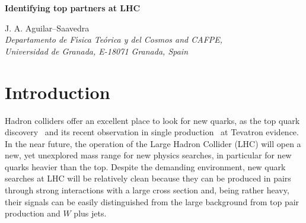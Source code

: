 \documentclass[12pt,a4paper]{article}
\newcommand{\fbin}{fb$^{-1}$}
\newcommand{\TB}{(T \, B)}
\newcommand{\XT}{(X \, T)}
\newcommand{\BY}{(B \, Y)}
\begin{document}
\begin{center}
\begin{Large}
{\bf Identifying top partners at LHC}
\end{Large}


\vspace{0.5cm}
J. A. Aguilar--Saavedra  \\[0.2cm] 
{\it Departamento de F\'{\i}sica Te\'orica y del Cosmos and CAFPE, \\
Universidad de Granada, E-18071 Granada, Spain} \\[0.1cm]
\end{center}

\begin{abstract}
We systematically study the possible signals at LHC of new vector-like quarks mainly coupled to the third generation. We consider heavy quarks $T$, $B$, $X$, $Y$ of charges $2/3$, $-1/3$, $5/3$ and $-4/3$, respectively, in $\text{SU}(2)_L$ isosinglets $T_{L,R}$, $B_{L,R}$, or isodoublets $\TB_{L,R}$, $\XT_{L,R}$ or $\BY_{L,R}$. Analyses based on a fast detector simulation are presented for twelve different final states containing one, two, three or four charged leptons in several invariant mass regions, also considering various $b$ quark multiplicities. It is shown that with the combination of the different channels the new quarks can be identified and their charged and neutral decays established. The comparison among final states also shows that the single lepton one offers the best discovery potential at LHC. For heavy quark masses of 500 GeV, the $5\sigma$ discovery luminosities range from 0.16 \fbin\ for a $\XT_{L,R}$ doublet to 1.9 \fbin\ for a $B_{L,R}$ singlet.
\end{abstract}




\section{Introduction}
\label{sec:1}

Hadron colliders offer an excellent place to look for new quarks, as the top quark discovery~\cite{Abe:1994xt} and its recent observation in single production~\cite{Abazov:2009ii,Aaltonen:2009jj} at Tevatron evidence. In the near future, the operation of the Large Hadron Collider (LHC) will open a new, yet unexplored mass range for new physics searches, in particular for new quarks heavier than the top.
Despite the demanding environment, new quark searches at LHC will be relatively clean because they can be produced in pairs through strong interactions with a large cross section and, being rather heavy, their signals can be easily distinguished from the large background from top pair production and $W$ plus jets.
\end{document}
